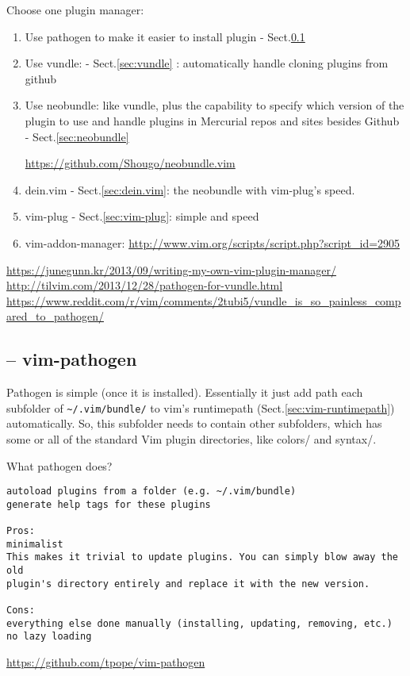 Choose one plugin manager:
\begin{enumerate}

  \item Use pathogen to make it easier to install plugin - Sect.\ref{sec:pathogen}
  
  
  \item Use vundle: - Sect.\ref{sec:vundle} : automatically handle cloning
  plugins from github

  \item Use neobundle: like vundle, plus the capability to specify which
version of the plugin to use and handle plugins in Mercurial repos and sites
besides Github - Sect.\ref{sec:neobundle}

\url{https://github.com/Shougo/neobundle.vim}

 \item dein.vim  - Sect.\ref{sec:dein.vim}: the neobundle with vim-plug's speed.
 
 \item vim-plug - Sect.\ref{sec:vim-plug}: simple and speed
 
  \item vim-addon-manager: 
\url{http://www.vim.org/scripts/script.php?script_id=2905}

\end{enumerate}

\url{https://junegunn.kr/2013/09/writing-my-own-vim-plugin-manager/}
\url{http://tilvim.com/2013/12/28/pathogen-for-vundle.html}
\url{https://www.reddit.com/r/vim/comments/2tubi5/vundle_is_so_painless_compared_to_pathogen/}

\subsection{-- vim-pathogen}
\label{sec:pathogen}

Pathogen is simple (once it is installed). Essentially it just add path each
subfolder of \verb!~/.vim/bundle/! to vim's runtimepath
(Sect.\ref{sec:vim-runtimepath}) automatically. So, this subfolder needs to
contain other subfolders, which has some or all of the standard Vim plugin
directories, like colors/ and syntax/.

What pathogen does?
\begin{verbatim}
autoload plugins from a folder (e.g. ~/.vim/bundle)
generate help tags for these plugins

Pros:
minimalist
This makes it trivial to update plugins. You can simply blow away the old
plugin's directory entirely and replace it with the new version.

Cons:
everything else done manually (installing, updating, removing, etc.)
no lazy loading
\end{verbatim}
\url{https://github.com/tpope/vim-pathogen}

